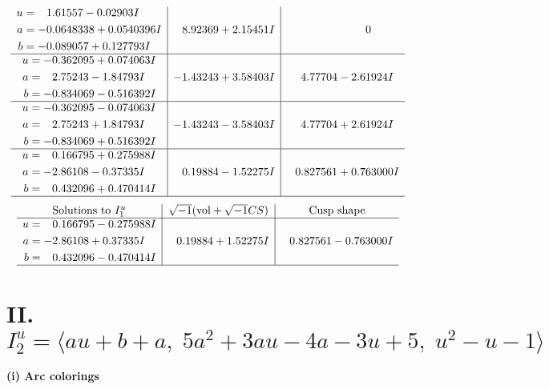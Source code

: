 \documentclass[1p]{elsarticle_modified}
\theoremstyle{definition}
\newcommand{\I}{\sqrt{-1}}
\begin{document}
$$\begin{array}{c|c|c}
\begin{aligned}
u &= \phantom{-}1.61557 - 0.02903 I \\
a &= -0.0648338 + 0.0540396 I \\
b &= -0.089057 + 0.127793 I\end{aligned}
 & \phantom{-}8.92369 + 2.15451 I & \phantom{-0.000000 } 0 \\ \hline\begin{aligned}
u &= -0.362095 + 0.074063 I \\
a &= \phantom{-}2.75243 - 1.84793 I \\
b &= -0.834069 - 0.516392 I\end{aligned}
 & -1.43243 + 3.58403 I & \phantom{-}4.77704 - 2.61924 I \\ \hline\begin{aligned}
u &= -0.362095 - 0.074063 I \\
a &= \phantom{-}2.75243 + 1.84793 I \\
b &= -0.834069 + 0.516392 I\end{aligned}
 & -1.43243 - 3.58403 I & \phantom{-}4.77704 + 2.61924 I \\ \hline\begin{aligned}
u &= \phantom{-}0.166795 + 0.275988 I \\
a &= -2.86108 - 0.37335 I \\
b &= \phantom{-}0.432096 + 0.470414 I\end{aligned}
 & \phantom{-}0.19884 - 1.52275 I & \phantom{-}0.827561 + 0.763000 I\\
 \hline 
 \end{array}$$\newpage$$\begin{array}{c|c|c}  
\text{Solutions to }I^u_{1}& \I (\text{vol} + \sqrt{-1}CS) & \text{Cusp shape}\\
 \hline 
\begin{aligned}
u &= \phantom{-}0.166795 - 0.275988 I \\
a &= -2.86108 + 0.37335 I \\
b &= \phantom{-}0.432096 - 0.470414 I\end{aligned}
 & \phantom{-}0.19884 + 1.52275 I & \phantom{-}0.827561 - 0.763000 I\\
 \hline 
 \end{array}$$\newpage\newpage\renewcommand{\arraystretch}{1}
\centering \section*{II. $I^u_{2}= \langle a u+b+a,\;5 a^2+3 a u-4 a-3 u+5,\;u^2- u-1 \rangle$}
\flushleft \textbf{(i) Arc colorings}\\
\end{document}
